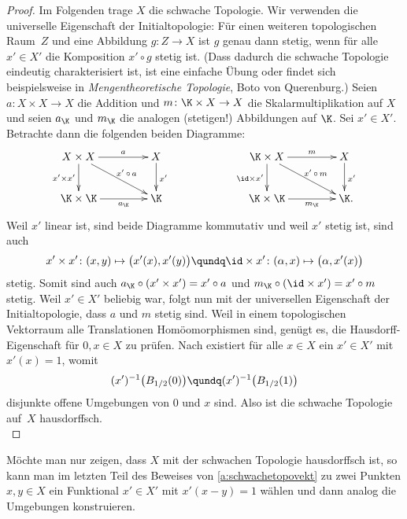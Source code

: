 \begin{proof}
    Im Folgenden trage $X$ die schwache Topologie.
    Wir verwenden die universelle Eigenschaft der Initialtopologie:
    Für einen weiteren topologischen Raum~$Z$ und eine Abbildung
    $g\colon Z\to X$ ist $g$ genau dann stetig, wenn
    für alle $x'\in X'$ die Komposition $x'\circ g$ stetig ist.
    (Dass dadurch die schwache Topologie eindeutig charakterisiert ist, ist
    eine einfache Übung oder findet sich beispielsweise in
    \emph{Mengentheoretische Topologie}, Boto von Querenburg.)
    Seien $a\colon X\times X\to X$ die Addition und
    $m\colon\K\times X\to X$ die Skalarmultiplikation auf $X$ und seien
    $a_\K$ und $m_\K$ die analogen (stetigen!) Abbildungen auf $\K$.
    Sei $x'\in X'$.  Betrachte dann die folgenden beiden Diagramme:
    \begin{equation*}
        \xymatrix@C=1.5cm{
            X\times X \ar[r]^-a \ar[rd]^-{x'\,\circ\,a} \ar[d]_{x'\times x'}
            & X \ar[d]^{x'}
            \\
            \K\times\K \ar[r]_-{a_\K}
            & \K
        }
        \hspace{2cm}
        \xymatrix@C=1.5cm{
            \K\times X \ar[r]^-m \ar[rd]^-{x'\,\circ\, m} \ar[d]_{\id\times x'}
            & X \ar[d]^{x'}
            \\
            \K\times\K \ar[r]_-{m_\K}
            & \K
            \rlap{.}
        }
    \end{equation*}
    Weil $x'$ linear ist, sind beide Diagramme kommutativ und weil $x'$ stetig
    ist, sind auch
    \[ x'\times x'\colon (x,y)\mapsto \bigl(x'(x),x'(y)\bigr)
        \qundq
        \id\times x'\colon (\alpha,x)\mapsto \bigl(\alpha,x'(x)\bigr)
    \]
    stetig. Somit sind auch $a_\K \circ (x'\times x') = x'\circ a$ 
    und $m_\K\circ (\id\times x') = x'\circ m$ stetig.
    Weil $x'\in X'$ beliebig war, folgt nun mit der universellen Eigenschaft der
    Initialtopologie, dass $a$ und $m$ stetig sind.
    \proofsep
    Weil in einem topologischen Vektorraum alle Translationen Homöomorphismen
    sind, genügt es, die Hausdorff-Eigenschaft für $0,x\in X$ zu prüfen. Nach
     existiert für alle $x\in X$ ein
    $x'\in X'$ mit $x'(x) = 1$, womit
    \[ (x')^{-1}\bigl( B_{1/2}(0) \bigr) \qundq
        (x')^{-1}\bigl( B_{1/2}(1) \bigr)
    \]
    disjunkte offene Umgebungen von $0$ und $x$ sind. Also ist die schwache
    Topologie auf~$X$ hausdorffsch.
    \\
\end{proof}

\begin{thBemerkung}
    Möchte man nur zeigen, dass $X$ mit der schwachen Topologie hausdorffsch ist,
    so kann man im letzten Teil des Beweises von \cref{a:schwachetopovekt} 
    zu zwei Punkten $x,y\in X$ ein Funktional $x'\in X'$ mit $x'(x-y)=1$ wählen
    und dann analog die Umgebungen konstruieren.
\end{thBemerkung}
